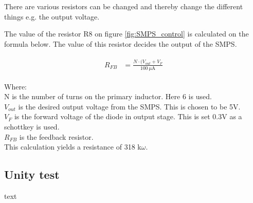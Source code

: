 There are various resistors can be changed and thereby change the different things e.g. the output voltage. 

The value of the resistor R8 on figure \ref{fig:SMPS_control} is calculated on the formula below. The value of this resistor decides the output of the SMPS.

\begin{align}
	\begin{split}
		R_{FB} &= \frac{N \cdot (V_{out}+V_F}{\SI{100}{\micro \ampere}}
	\end{split}
\end{align}

Where:\\
N is the number of turns on the primary inductor. Here 6 is used. \\
$V_{out}$ is the desired output voltage from the SMPS. This is chosen to be 5V. \\
$V_F$ is the forward voltage of the diode in output stage. This is set 0.3V as a schottkey is used. \\
$R_{FB}$ is the feedback resistor. \\

This calculation yields a resistance of 318 k$\omega$.

\subsection{Unity test}
text